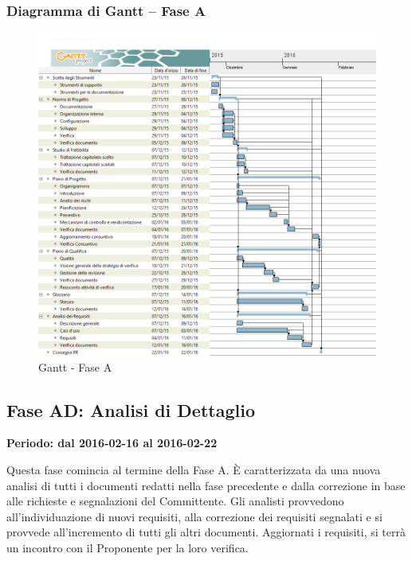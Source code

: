 \documentclass[../PianoProgetto.tex]{subfiles}
\begin{document}
		\subsubsection{Diagramma di Gantt – Fase A}
			\begin{figure}[!h]
				\centering
				\includegraphics[width=\textwidth]{gantt_png/1-analisi}
				\caption{Gantt - Fase A}
				\label{fig:Gantt - Fase A}
			\end{figure}			
		
	\subsection{Fase AD: Analisi di Dettaglio}
		\textbf{Periodo: dal 2016-02-16 al 2016-02-22}

				Questa fase comincia al termine della Fase A. È caratterizzata da una nuova analisi di tutti i documenti redatti nella fase precedente e dalla correzione in base alle richieste e segnalazioni del Committente. Gli analisti provvedono all’individuazione di nuovi requisiti, alla correzione dei requisiti segnalati e si provvede all’incremento di tutti gli altri documenti.  Aggiornati i requisiti, si terrà un incontro con il Proponente per la loro verifica.
			
\end{document}
